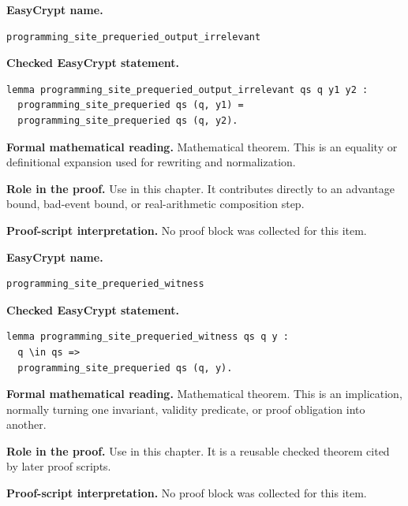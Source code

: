 \begin{formaltheorem}
\noindent\textbf{EasyCrypt name.}
\begin{lstlisting}[language=EasyCrypt,basicstyle=\ttfamily\scriptsize]
programming_site_prequeried_output_irrelevant
\end{lstlisting}
\noindent\textbf{Checked EasyCrypt statement.}
\begin{lstlisting}[language=EasyCrypt,basicstyle=\ttfamily\scriptsize]
lemma programming_site_prequeried_output_irrelevant qs q y1 y2 :
  programming_site_prequeried qs (q, y1) =
  programming_site_prequeried qs (q, y2).
\end{lstlisting}
\noindent\textbf{Formal mathematical reading.}
Mathematical theorem. This is an equality or definitional expansion used for rewriting and normalization.

\noindent\textbf{Role in the proof.}
Use in this chapter. It contributes directly to an advantage bound, bad-event bound, or real-arithmetic composition step.

\noindent\textbf{Proof-script interpretation.}
No proof block was collected for this item.

\end{formaltheorem}

\begin{formaltheorem}
\noindent\textbf{EasyCrypt name.}
\begin{lstlisting}[language=EasyCrypt,basicstyle=\ttfamily\scriptsize]
programming_site_prequeried_witness
\end{lstlisting}
\noindent\textbf{Checked EasyCrypt statement.}
\begin{lstlisting}[language=EasyCrypt,basicstyle=\ttfamily\scriptsize]
lemma programming_site_prequeried_witness qs q y :
  q \in qs =>
  programming_site_prequeried qs (q, y).
\end{lstlisting}
\noindent\textbf{Formal mathematical reading.}
Mathematical theorem. This is an implication, normally turning one invariant, validity predicate, or proof obligation into another.

\noindent\textbf{Role in the proof.}
Use in this chapter. It is a reusable checked theorem cited by later proof scripts.

\noindent\textbf{Proof-script interpretation.}
No proof block was collected for this item.

\end{formaltheorem}

